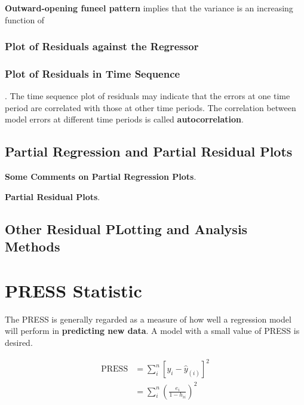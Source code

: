 \documentclass[12pt]{article}
\begin{document}
\textbf{Outward-opening funeel pattern} implies that the variance is an increasing function of 


\subsubsection*{Plot of Residuals against the Regressor}


\subsubsection*{Plot of Residuals in Time Sequence}. 
The time sequence plot of residuals may indicate that the errors at one time period are correlated with those at other time periods. The correlation between model errors at different time periods is called \textbf{autocorrelation}. 


\subsection{Partial Regression and Partial Residual Plots}




\textbf{Some Comments on Partial Regression Plots}. 

\textbf{Partial Residual Plots}. 

\setcounter{subsection}{5}
\subsection{Other Residual PLotting and Analysis Methods}


\section{PRESS Statistic}

The PRESS is generally regarded as a measure of how well a regression model will perform in \textbf{predicting new data}. A model with a small value of PRESS is desired.

$$
\begin{aligned}
\mathrm{PRESS} &= \sum_i^n [y_i - \hat{y}_{(i)}]^2 \\[8pt]
&= \sum_i^n \left( \frac{e_i}{1-h_{ii}} \right)^2
\end{aligned}
$$
\end{document}
